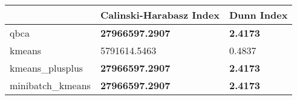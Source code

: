 \begin{table}[htbp]
\centering
\begin{tabular}{lll}
\toprule
 & Calinski-Harabasz Index & Dunn Index \\
\midrule
qbca & \textbf{27966597.2907} & \textbf{2.4173} \\
kmeans & 5791614.5463 & 0.4837 \\
kmeans_plusplus & \textbf{27966597.2907} & \textbf{2.4173} \\
minibatch_kmeans & \textbf{27966597.2907} & \textbf{2.4173} \\
\bottomrule
\end{tabular}
\end{table}
